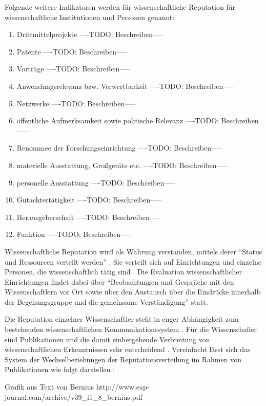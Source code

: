 Folgende weitere Indikatoren werden für wissenschaftliche Reputation für wissenschaftliche Institutionen und Personen genannt\cite{hanekop_2008}:
\begin{enumerate}
\item Drittmittelprojekte
----TODO: Beschreiben-----
\item Patente
----TODO: Beschreiben-----
\item Vorträge
----TODO: Beschreiben-----
\item Anwendungsrelevanz bzw. Verwertbarkeit
----TODO: Beschreiben-----
\item Netzwerke
----TODO: Beschreiben-----
\item öffentliche Aufmerksamkeit sowie politische Relevanz 
----TODO: Beschreiben-----
\item Renommee der Forschungseinrichtung
----TODO: Beschreiben-----
\item materielle Ausstattung, Großgeräte etc.
----TODO: Beschreiben-----
\item personelle Ausstattung
----TODO: Beschreiben-----
\item Gutachtertätigkeit
----TODO: Beschreiben-----
\item Herausgeberschaft
----TODO: Beschreiben-----
\item Funktion
----TODO: Beschreiben-----
\end{enumerate}

Wissenschaftliche Reputation wird als Währung verstanden, mittels derer “Status und Ressourcen verteilt werden” \cite{hanekop_2006}. Sie verteilt sich auf Einrichtungen und einzelne Personen, die wissenschaftlich tätig sind \cite{suchen}. Die Evaluation wissenschaftlicher Einrichtungen findet dabei über “Beobachtungen und Gespräche mit den Wissenschaftlern vor Ort sowie über den Austausch über die Eindrücke innerhalb der Begehungsgruppe und die gemeinsame Verständigung”\cite{Barl_sius_2008} statt.

Die Reputation einzelner Wissenschaftler steht in enger Abhängigkeit zum bestehenden wissenschaftlichen Kommunikationssystem \cite{suchen}. Für die Wissenschafler sind Publikationen und die damit einhergehende Verbreitung von wissenschaftlichen Erkenntnissen sehr entscheidend \cite{Hess_2006}. Vereinfacht lässt sich das System der Wechselbeziehungen der Reputationsverteilung im Rahmen von Publikationen wie folgt darstellen \cite{cite:21a}: 

Grafik aus Text von Bernius
http://www.eap-journal.com/archive/v39_i1_8_bernius.pdf

